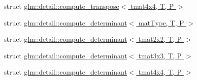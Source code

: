 \begin{DoxyCompactItemize}
struct \hyperlink{structglm_1_1detail_1_1compute__transpose_3_01tmat4x4_00_01T_00_01P_01_4}{glm\-::detail\-::compute\-\_\-transpose$<$ tmat4x4, T, P $>$}
\item 
struct \hyperlink{structglm_1_1detail_1_1compute__determinant}{glm\-::detail\-::compute\-\_\-determinant$<$ mat\-Type, T, P $>$}
\item 
struct \hyperlink{structglm_1_1detail_1_1compute__determinant_3_01tmat2x2_00_01T_00_01P_01_4}{glm\-::detail\-::compute\-\_\-determinant$<$ tmat2x2, T, P $>$}
\item 
struct \hyperlink{structglm_1_1detail_1_1compute__determinant_3_01tmat3x3_00_01T_00_01P_01_4}{glm\-::detail\-::compute\-\_\-determinant$<$ tmat3x3, T, P $>$}
\item 
struct \hyperlink{structglm_1_1detail_1_1compute__determinant_3_01tmat4x4_00_01T_00_01P_01_4}{glm\-::detail\-::compute\-\_\-determinant$<$ tmat4x4, T, P $>$}
\end{DoxyCompactItemize}
